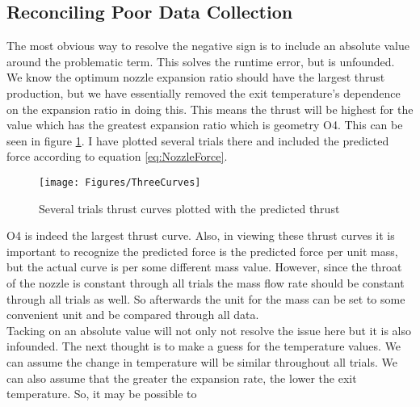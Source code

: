 \subsection{Reconciling Poor Data Collection}
The most obvious way to resolve the negative sign is to include an absolute value around the problematic term. This solves the runtime error, but is unfounded. We know the optimum nozzle expansion ratio should have the largest thrust production, but we have essentially removed the exit temperature's dependence on the expansion ratio in doing this. This means the thrust will be highest for the value which has the greatest expansion ratio which is geometry O4. This can be seen in figure \ref{fig:ForcesAbs}. I have plotted several trials there and included the predicted force according to equation \ref{eq:NozzleForce}.
\begin{figure}[h!]
\centering
\texttt{[image: Figures/ThreeCurves]}
\caption{Several trials thrust curves plotted with the predicted thrust}
\label{fig:ForcesAbs}
\end{figure}
O4 is indeed the largest thrust curve. Also, in viewing these thrust curves it is important to recognize the predicted force is the predicted force per unit mass, but the actual curve is per some different mass value. However, since the throat of the nozzle is constant through all trials the mass flow rate should be constant through all trials as well. So afterwards the unit for the mass can be set to some convenient unit and be compared through all data.\\
Tacking on an absolute value will not only not resolve the issue here but it is also infounded. The next thought is to make a guess for the temperature values. We can assume the change in temperature will be similar throughout all trials. We can also assume that the greater the expansion rate, the lower the exit temperature. So, it may be possible to